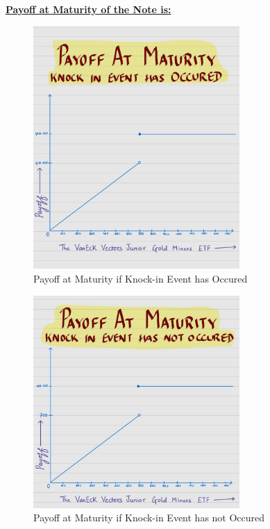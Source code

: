\documentclass[12pt,a4paper]{article}
\begin{document}
\underline{\textbf{Payoff at Maturity of the Note is:}}
\begin{figure}[H]
    \centering
    \includegraphics[width=0.7\textwidth, height=0.4\textheight]{images_project_3/KIN.jpeg}
    \caption{Payoff at Maturity if Knock-in Event has Occured}
    \label{fig:yourlabel}
\end{figure}

\begin{figure}[H]
    \centering
    \includegraphics[width=0.7\textwidth, height=0.4\textheight]{images_project_3/KI.jpeg}
    \caption{Payoff at Maturity if Knock-in Event has not Occured}
    \label{fig:yourlabel}
\end{figure}
\end{document}
